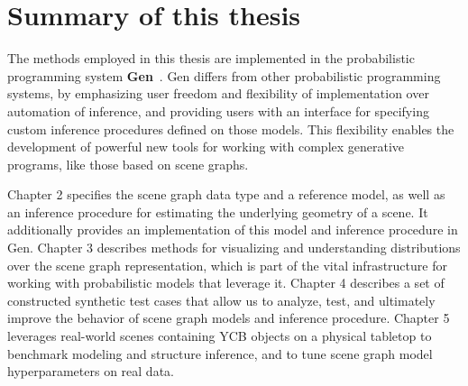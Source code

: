 \section{Summary of this thesis}
The methods employed in this thesis are implemented in the probabilistic programming system \textbf{Gen}~\cite{Cusumano-Towner:2019:GGP:3314221.3314642}.
Gen differs from other probabilistic programming systems, by emphasizing user freedom and flexibility of implementation over automation of inference, and providing users with an interface for specifying custom inference procedures defined on those models.
This flexibility enables the development of powerful new tools for working with complex generative programs, like those based on scene graphs.

Chapter 2 specifies the scene graph data type and a reference model, as well as an inference procedure for estimating the underlying geometry of a scene.
It additionally provides an implementation of this model and inference procedure in Gen.
Chapter 3 describes methods for visualizing and understanding distributions over the scene graph representation, which is part of the vital infrastructure for working with probabilistic models that leverage it.
Chapter 4 describes a set of constructed synthetic test cases that allow us to analyze, test, and ultimately improve the behavior of scene graph models and inference procedure.
Chapter 5 leverages real-world scenes containing YCB objects on a physical tabletop to benchmark modeling and structure inference, and to tune scene graph model hyperparameters on real data.
